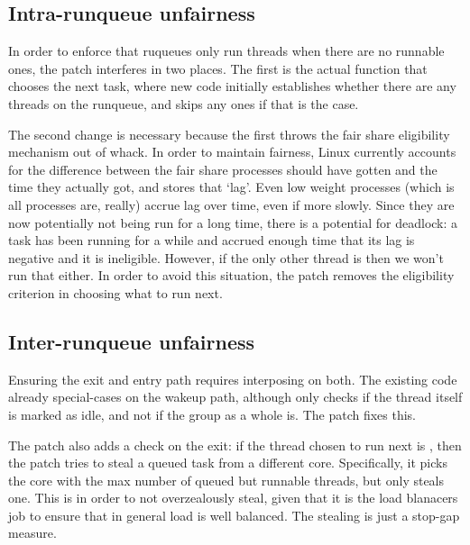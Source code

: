 \subsection{Intra-runqueue unfairness}

In order to enforce that ruqueues only run \schedbe{} threads when there are no
runnable \schednormal{} ones, the patch interferes in two places. The first is
the actual function that chooses the next task, where new code initially
establishes whether there are any \schednormal{} threads on the runqueue, and
skips any \schedbe{} ones if that is the case. 

The second change is necessary because the first throws the fair share
eligibility mechanism out of whack. In order to maintain fairness, Linux
currently accounts for the difference between the fair share processes should
have gotten and the time they actually got, and stores that `lag'. Even low
weight processes (which is all \schedidle{} processes are, really) accrue lag
over time, even if more slowly. Since they are now potentially not being run for
a long time, there is a potential for deadlock: a \schednormal{} task has been
running for a while and accrued enough time that its lag is negative and it is
ineligible. However, if the only other thread is \schedbe{} then we won't run
that either. In order to avoid this situation, the patch removes the eligibility
criterion in choosing what to run next.


\subsection{Inter-runqueue unfairness}


Ensuring the exit and entry path requires interposing on both. The existing code
already special-cases on the wakeup path, although only checks if the thread
itself is marked as idle, and not if the group as a whole is. The patch fixes this.

The patch also adds a check on the exit: if the thread chosen to run next is
\schedbe{}, then the patch tries to steal a queued \schednormal{} task from a
different core. Specifically, it picks the core with the max number of queued
but runnable \schednormal{} threads, but only steals one. This is in order to
not overzealously steal, given that it is the load blanacers job to ensure that
in general load is well balanced. The stealing is just a stop-gap measure.


